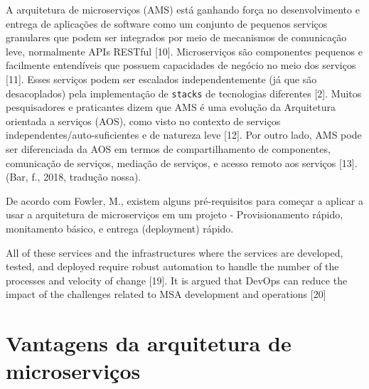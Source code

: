 A arquitetura de microserviços (AMS) está ganhando força no desenvolvimento e entrega de aplicações de software como um conjunto de pequenos serviços granulares que podem ser integrados por meio de mecanismos de comunicação leve, normalmente APIs RESTful [10]. Microserviços são componentes pequenos e facilmente entendíveis que possuem capacidades de negócio no meio dos serviços [11]. Esses serviços podem ser escalados independentemente (já que são desacoplados) pela implementação de \texttt{stacks} de tecnologias diferentes [2]. Muitos pesquisadores e praticantes dizem que AMS é uma evolução da Arquitetura orientada a serviços (AOS), como visto no contexto de serviços independentes/auto-suficientes e de natureza leve [12]. Por outro lado, AMS pode ser diferenciada da AOS em termos de compartilhamento de componentes, comunicação de serviços, mediação de serviços, e acesso remoto aos serviços [13]. (Bar, f., 2018, tradução nossa). \cite{WASEEM2020110798}

De acordo com Fowler, M., existem alguns pré-requisitos para começar a aplicar a usar a arquitetura de microserviços em um projeto - Provisionamento rápido, monitamento básico, e entrega (deployment) rápido.



All of these services and the infrastructures where the services are developed, tested, and deployed require robust automation to handle the number of the processes and velocity of change [19]. It is argued that DevOps can reduce the impact of the challenges related to MSA development and operations [20]

\section{Vantagens da arquitetura de microserviços}

